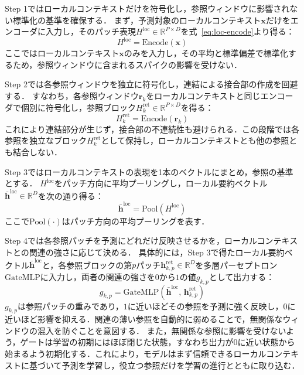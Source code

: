 \documentclass[twocolumn, lastpage]{jarticle}
\begin{document}
Step 1ではローカルコンテキストだけを符号化し，参照ウィンドウに影響されない標準化の基準を確保する．
まず，予測対象のローカルコンテキスト$\bm{x}$だけをエンコーダに入力し，そのパッチ表現$H^{\mathrm{loc}} \in \mathbb{R}^{P \times D}$を式~\eqref{eq:loc-encode}より得る：
        \begin{equation}\label{eq:loc-encode}
            H^{\mathrm{loc}} = \mathrm{Encode}(\bm{x})
        \end{equation}
ここではローカルコンテキスト$\bm{x}$のみを入力し，その平均と標準偏差で標準化するため，参照ウィンドウに含まれるスパイクの影響を受けない．

Step 2では各参照ウィンドウを独立に符号化し，連結による接合部の作成を回避する．
すなわち，各参照ウィンドウ$\bm{r}_k$をローカルコンテキストと同じエンコーダで個別に符号化し，参照ブロック$H^{\mathrm{ret}}_k \in \mathbb{R}^{P \times D}$を得る：
    \begin{equation}\label{eq:ret-encode}
        H^{\mathrm{ret}}_k = \mathrm{Encode}(\bm{r}_k)
    \end{equation}
これにより連結部分が生じず，接合部の不連続性も避けられる．この段階では各参照を独立なブロック$H^{\mathrm{ret}}_k$として保持し，ローカルコンテキストとも他の参照とも結合しない．

Step 3ではローカルコンテキストの表現を1本のベクトルにまとめ，参照の基準とする．
$H^{\mathrm{loc}}$をパッチ方向に平均プーリングし，ローカル要約ベクトル$\bar{\bm{h}}^{\mathrm{loc}} \in \mathbb{R}^{D}$を次の通り得る：
    \begin{equation}
        \bar{\bm{h}}^{\mathrm{loc}} = \mathrm{Pool}(H^{\mathrm{loc}})
    \end{equation}
ここで$\mathrm{Pool}(\cdot)$はパッチ方向の平均プーリングを表す．

Step 4では各参照パッチを予測にどれだけ反映させるかを，ローカルコンテキストとの関連の強さに応じて決める．
具体的には，Step 3で得たローカル要約ベクトル$\bar{\bm{h}}^{\mathrm{loc}}$と，各参照ブロックの第$p$パッチ$\bm{h}^{\mathrm{ret}}_{k,p} \in \mathbb{R}^{D}$を多層パーセプトロン$\mathrm{GateMLP}$に入力し，両者の関連の強さを$0$から$1$の値$g_{k,p}$として出力する：
    \begin{equation}
        g_{k,p} = \mathrm{GateMLP}(\bar{\bm{h}}^{\mathrm{loc}},\, \bm{h}^{\mathrm{ret}}_{k,p})
    \end{equation}
$g_{k,p}$は参照パッチの重みであり，$1$に近いほどその参照を予測に強く反映し，$0$に近いほど影響を抑える．関連の薄い参照を自動的に弱めることで，無関係なウィンドウの混入を防ぐことを意図する．
また，無関係な参照に影響を受けないよう，ゲートは学習の初期にはほぼ閉じた状態，すなわち出力が$0$に近い状態から始まるよう初期化する．これにより，モデルはまず信頼できるローカルコンテキストに基づいて予測を学習し，役立つ参照だけを学習の進行とともに取り込む．
\end{document}
